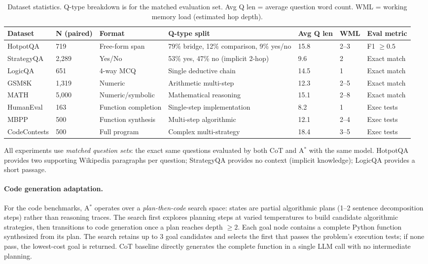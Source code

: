 \documentclass{article}
\newcommand{\astar}{A$^*$\xspace}
\begin{document}
\begin{table}[h]
\centering
\caption{Dataset statistics. Q-type breakdown is for the matched evaluation set. Avg Q len = average question word count. WML = working memory load (estimated hop depth).}
\label{tab:datasets}
\small
\begin{tabular}{lllllll}
\toprule
Dataset & N (paired) & Format & Q-type split & Avg Q len & WML & Eval metric \\
\midrule
HotpotQA   & 719  & Free-form span & 79\% bridge, 12\% comparison, 9\% yes/no & 15.8 & 2--3 & F1 $\geq0.5$ \\
StrategyQA & 2,289 & Yes/No       & 53\% yes, 47\% no (implicit 2-hop)        &  9.6 & 2   & Exact match \\
LogicQA    & 651  & 4-way MCQ      & Single deductive chain                    & 14.5 & 1   & Exact match \\
GSM8K      & 1,319 & Numeric      & Arithmetic multi-step                     & 12.3 & 2--5 & Exact match \\
MATH       & 5,000 & Numeric/symbolic & Mathematical reasoning                & 15.1 & 2--8 & Exact match \\
\midrule
HumanEval  & 163  & Function completion & Single-step implementation           &  8.2 & 1   & Exec tests \\
MBPP       & 500  & Function synthesis  & Multi-step algorithmic               & 12.1 & 2--4 & Exec tests \\
CodeContests & 500 & Full program       & Complex multi-strategy               & 18.4 & 3--5 & Exec tests \\
\bottomrule
\end{tabular}
\end{table}

All experiments use \emph{matched question sets}: the exact same questions evaluated by both CoT and \astar with the same model. HotpotQA provides two supporting Wikipedia paragraphs per question; StrategyQA provides no context (implicit knowledge); LogicQA provides a short passage.

\paragraph{Code generation adaptation.}
For the code benchmarks, \astar operates over a \emph{plan-then-code} search space: states are partial algorithmic plans (1--2 sentence decomposition steps) rather than reasoning traces. The search first explores planning steps at varied temperatures to build candidate algorithmic strategies, then transitions to code generation once a plan reaches depth $\geq 2$. Each goal node contains a complete Python function synthesized from its plan. The search retains up to 3 goal candidates and selects the first that passes the problem's execution tests; if none pass, the lowest-cost goal is returned. CoT baseline directly generates the complete function in a single LLM call with no intermediate planning.
\end{document}
